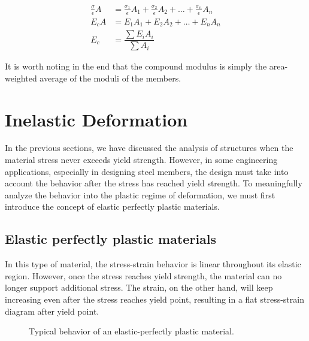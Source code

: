 \documentclass[
10pt,
a4paper,
openany,
svgnames,
]{book} %
\begin{document}
\begin{align}
  \label{eq: compound modulus}
  \frac{\sigma}{\epsilon} A &= \frac{\sigma_1}{\epsilon} A_1 + \frac{\sigma_2}{\epsilon} A_2 + \ldots + \frac{\sigma_n}{\epsilon} A_n \nonumber \\
  E_cA &= E_1 A_1 + E_2A_2 + \ldots + E_nA_n \nonumber \\
  E_c &= \dfrac{\sum E_iA_i}{\sum A_i}
\end{align}

It is worth noting in the end that the compound modulus is simply the area-weighted average of the moduli of the members.

\section{Inelastic Deformation}

In the previous sections, we have discussed the analysis of structures when the material stress never exceeds yield strength. However, in some engineering applications, especially in designing steel members, the design must take into account the behavior after the stress has reached yield strength. To meaningfully analyze the behavior into the plastic regime of deformation, we must first introduce the concept of elastic perfectly plastic materials.

\subsection{Elastic perfectly plastic materials}

In this type of material, the stress-strain behavior is linear throughout its elastic region. However, once the stress reaches yield strength, the material can no longer support additional stress. The strain, on the other hand, will keep increasing even after the stress reaches yield point, resulting in a flat stress-strain diagram after yield point.

\begin{figure}[h]
  \centering
  \caption{Typical behavior of an elastic-perfectly plastic material.}
\end{figure}
\end{document}
